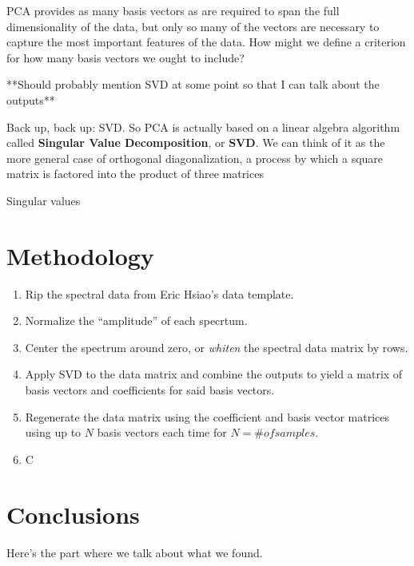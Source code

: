 \documentclass{article}
\newcommand{\defn}[1]{\textbf{#1}}
\begin{document}
  PCA provides as many basis vectors as are required to span the full
  dimensionality of the data, but only so many of the vectors are
  necessary to capture the most important features of the data.  How
  might we define a criterion for how many basis vectors we ought to
  include?

  **Should probably mention SVD at some point so that I can talk about
  the outputs**

  Back up, back up: SVD.  So PCA is actually based on a linear algebra
  algorithm called \defn{Singular Value Decomposition}, or
  \defn{SVD}.  We can think of it as the more general case of
  orthogonal diagonalization, a process by which a square matrix is
  factored into the product of three matrices 

  Singular values







\section{Methodology}
\label{sec:procedure}

\begin{enumerate}
\item Rip the spectral data from Eric Hsiao's data template.
\item Normalize the ``amplitude'' of each specrtum.
\item Center the spectrum around zero, or \emph{whiten} the spectral
  data matrix by rows.
\item Apply SVD to the data matrix and combine the outputs to yield a
  matrix of basis vectors and coefficients for said basis vectors.
\item Regenerate the data matrix using the coefficient and basis
  vector matrices using up to $N$ basis vectors each time for $N = \#
  of samples$.
\item C
\end{enumerate}



\section{Conclusions}
\label{sec:conclusions}

Here's the part where we talk about what we found.
\end{document}
